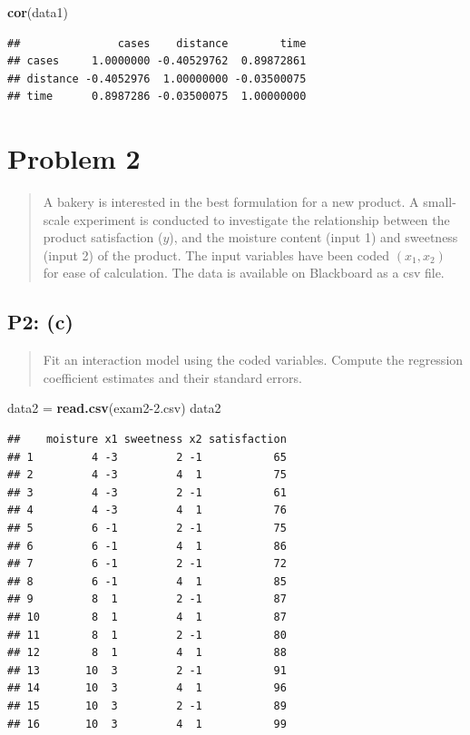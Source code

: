 \documentclass[
]{article}
\newenvironment{Shaded}{\begin{snugshade}}{\end{snugshade}}
\newcommand{\FunctionTok}[1]{\textcolor[rgb]{0.13,0.29,0.53}{\textbf{#1}}}
\newcommand{\NormalTok}[1]{#1}
\newcommand{\OtherTok}[1]{\textcolor[rgb]{0.56,0.35,0.01}{#1}}
\newcommand{\StringTok}[1]{\textcolor[rgb]{0.31,0.60,0.02}{#1}}
\begin{document}
\begin{Shaded}
\begin{Highlighting}[]
\FunctionTok{cor}\NormalTok{(data1)}
\end{Highlighting}
\end{Shaded}

\begin{verbatim}
##               cases    distance        time
## cases     1.0000000 -0.40529762  0.89872861
## distance -0.4052976  1.00000000 -0.03500075
## time      0.8987286 -0.03500075  1.00000000
\end{verbatim}

\hypertarget{problem-2}{%
\section{Problem 2}\label{problem-2}}

\begin{quote}
A bakery is interested in the best formulation for a new product. A
small-scale experiment is conducted to investigate the relationship
between the product satisfaction (\(y\)), and the moisture content
(input 1) and sweetness (input 2) of the product. The input variables
have been coded \((x_1,x_2)\) for ease of calculation. The data is
available on Blackboard as a csv file.
\end{quote}

\hypertarget{p2-c}{%
\subsection{P2: (c)}\label{p2-c}}

\begin{quote}
Fit an interaction model using the coded variables. Compute the
regression coefficient estimates and their standard errors.
\end{quote}

\begin{Shaded}
\begin{Highlighting}[]
\NormalTok{data2 }\OtherTok{=} \FunctionTok{read.csv}\NormalTok{(}\StringTok{\textquotesingle{}exam2{-}2.csv\textquotesingle{}}\NormalTok{)}
\NormalTok{data2}
\end{Highlighting}
\end{Shaded}

\begin{verbatim}
##    moisture x1 sweetness x2 satisfaction
## 1         4 -3         2 -1           65
## 2         4 -3         4  1           75
## 3         4 -3         2 -1           61
## 4         4 -3         4  1           76
## 5         6 -1         2 -1           75
## 6         6 -1         4  1           86
## 7         6 -1         2 -1           72
## 8         6 -1         4  1           85
## 9         8  1         2 -1           87
## 10        8  1         4  1           87
## 11        8  1         2 -1           80
## 12        8  1         4  1           88
## 13       10  3         2 -1           91
## 14       10  3         4  1           96
## 15       10  3         2 -1           89
## 16       10  3         4  1           99
\end{verbatim}
\end{document}
